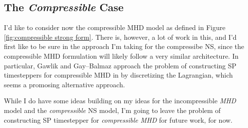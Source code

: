 \subsection*{The \emph{Compressible} Case}
    \begin{remark}
        I'd like to consider now the compressible MHD model as defined in Figure \ref{fig:compressible strong form}. There is, however, a lot of work in this, and I'd first like to be sure in the approach I'm taking for the compressibe NS, since the compressible MHD formulation will likely follow a very similar architecture. In particular, Gawlik and Gay--Balmaz approach the problem of constructing SP timesteppers for compressible MHD in \cite{Gawlik_Gay--Balmaz_2021,Gawlik_Gay--Balmaz_2022} by discretizing the Lagrangian, which seems a promosing alternative approach.
        
        While I do have some ideas building on my ideas for the incompressible \emph{MHD} model and the \emph{compressible} NS model, I'm going to leave the problem of constructing SP timestepper for \emph{compressible MHD} for future work, for now.
    \end{remark}
